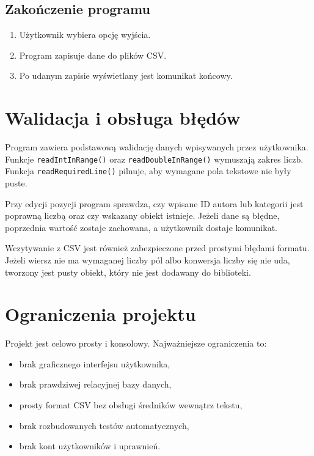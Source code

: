 \documentclass[12pt,a4paper]{article}
\begin{document}
\subsection{Zakończenie programu}

\begin{enumerate}
    \item Użytkownik wybiera opcję wyjścia.
    \item Program zapisuje dane do plików CSV.
    \item Po udanym zapisie wyświetlany jest komunikat końcowy.
\end{enumerate}

\section{Walidacja i obsługa błędów}

Program zawiera podstawową walidację danych wpisywanych przez użytkownika. Funkcje
\texttt{readIntInRange()} oraz \texttt{readDoubleInRange()} wymuszają zakres liczb.
Funkcja \texttt{readRequiredLine()} pilnuje, aby wymagane pola tekstowe nie były puste.

Przy edycji pozycji program sprawdza, czy wpisane ID autora lub kategorii jest poprawną
liczbą oraz czy wskazany obiekt istnieje. Jeżeli dane są błędne, poprzednia wartość
zostaje zachowana, a użytkownik dostaje komunikat.

Wczytywanie z CSV jest również zabezpieczone przed prostymi błędami formatu. Jeżeli
wiersz nie ma wymaganej liczby pól albo konwersja liczby się nie uda, tworzony jest
pusty obiekt, który nie jest dodawany do biblioteki.

\section{Ograniczenia projektu}

Projekt jest celowo prosty i konsolowy. Najważniejsze ograniczenia to:

\begin{itemize}
    \item brak graficznego interfejsu użytkownika,
    \item brak prawdziwej relacyjnej bazy danych,
    \item prosty format CSV bez obsługi średników wewnątrz tekstu,
    \item brak rozbudowanych testów automatycznych,
    \item brak kont użytkowników i uprawnień.
\end{itemize}
\end{document}

